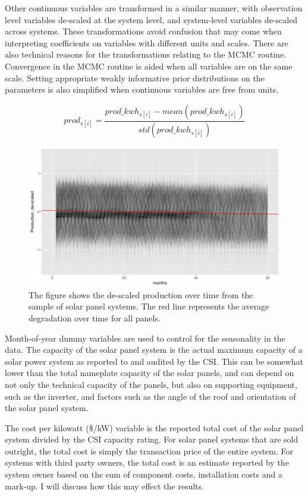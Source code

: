 \documentclass[a4paper]{article}
\begin{document}
Other continuous variables are transformed in a similar manner, with observation level variables de-scaled at the system level, and system-level variables de-scaled across systems. These transformations avoid confusion that may come when interpreting coefficients on variables with different units and scales. There are also technical reasons for the transformations relating to the MCMC routine. Convergence in the MCMC routine is aided when all variables are on the same scale. Setting appropriate weakly informative prior distributions on the parameters is also simplified when continuous variables are free from units.

\begin{equation}
prod_{s[i]} = \frac{prod\_kwh_{s[i]} - mean(prod\_kwh_{s[i]})}{std(prod\_kwh_{s[i]})}
\label{eqn:descaled}
\end{equation}

\begin{figure}
  \includegraphics[width=1\linewidth]{figures/production.png}
  \caption{The figure shows the de-scaled production over time from the sample of solar panel systems. The red line represents the average degradation over time for all panels.}
  \label{fig:production}
\end{figure}

Month-of-year dummy variables are used to control for the seasonality in the data. The capacity of the solar panel system is the actual maximum capacity of a solar power system as reported to and audited by the CSI. This can be somewhat lower than the total nameplate capacity of the solar panels, and can depend on not only the technical capacity of the panels, but also on supporting equipment, such as the inverter, and factors such as the angle of the roof and orientation of the solar panel system.

The cost per kilowatt (\$/kW) variable is the reported total cost of the solar panel system divided by the CSI capacity rating. For solar panel systems that are sold outright, the total cost is simply the transaction price of the entire system. For systems with third party owners, the total cost is an estimate reported by the system owner based on the sum of component costs, installation costs and a mark-up. I will discuss how this may effect the results.
\end{document}
